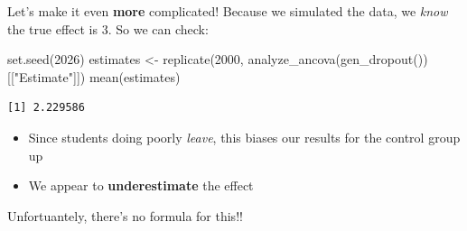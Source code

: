 \documentclass[
  ignorenonframetext,
  aspectratio=169,
]{beamer}
\newenvironment{Shaded}{\begin{snugshade}}{\end{snugshade}}
\newcommand{\DecValTok}[1]{\textcolor[rgb]{0.68,0.00,0.00}{#1}}
\newcommand{\FunctionTok}[1]{\textcolor[rgb]{0.28,0.35,0.67}{#1}}
\newcommand{\NormalTok}[1]{\textcolor[rgb]{0.00,0.23,0.31}{#1}}
\newcommand{\OtherTok}[1]{\textcolor[rgb]{0.00,0.23,0.31}{#1}}
\newcommand{\StringTok}[1]{\textcolor[rgb]{0.13,0.47,0.30}{#1}}
\providecommand{\tightlist}{%
  \setlength{\itemsep}{0pt}\setlength{\parskip}{0pt}}\usepackage{longtable,booktabs,array}
\begin{document}
\begin{frame}[fragile]{Let's make it even \textbf{more} complicated!}
\label{lets-make-it-even-more-complicated-3}
Because we simulated the data, we \emph{know} the true effect is 3. So
we can check:

\begin{Shaded}
\begin{Highlighting}[]
\FunctionTok{set.seed}\NormalTok{(}\DecValTok{2026}\NormalTok{)}
\NormalTok{estimates }\OtherTok{\textless{}{-}} \FunctionTok{replicate}\NormalTok{(}\DecValTok{2000}\NormalTok{, }\FunctionTok{analyze\_ancova}\NormalTok{(}\FunctionTok{gen\_dropout}\NormalTok{())[[}\StringTok{"Estimate"}\NormalTok{]])}
\FunctionTok{mean}\NormalTok{(estimates)}
\end{Highlighting}
\end{Shaded}

\begin{verbatim}
[1] 2.229586
\end{verbatim}

\vskip10pt

\begin{itemize}
\tightlist
\item
  Since students doing poorly \emph{leave}, this biases our results for
  the control group up
\item
  We appear to \textbf{underestimate} the effect
\end{itemize}

\begin{center}
Unfortuantely, there's no formula for this!!
\end{center}
\end{frame}
\end{document}
